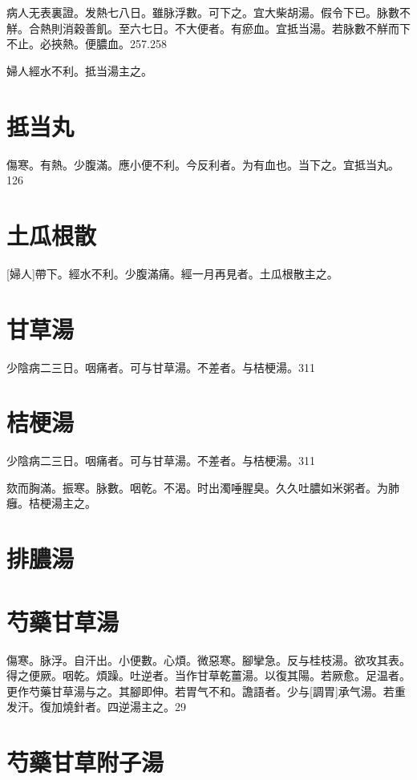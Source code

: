 \documentclass[12pt,oneside,UTF8,b5paper]{ctexbook}她她她她她她她
\begin{document}
病人无表裏證。发熱七八日。雖脉浮數。可下之。宜大柴胡湯。假令下已。脉數不觧。合熱則消穀善飢。至六七日。不大便者。有瘀血。宜抵当湯。若脉數不觧而下不止。必挾熱。便膿血。257.258

婦人經水不利。抵当湯主之。

\section{抵当丸}

傷寒。有熱。少腹滿。應小便不利。今反利者。为有血也。当下之。宜抵当丸。126

\section{土瓜根散}

[婦人]帶下。經水不利。少腹滿痛。經一月再見者。土瓜根散主之。

\section{甘草湯}

少陰病二三日。咽痛者。可与甘草湯。不差者。与桔梗湯。311

\section{桔梗湯}

少陰病二三日。咽痛者。可与甘草湯。不差者。与桔梗湯。311

欬而胸滿。振寒。脉數。咽乾。不渴。时出濁唾腥臭。久久吐膿如米粥者。为肺癰。桔梗湯主之。

\section{排膿湯}

\section{芍藥甘草湯}

傷寒。脉浮。自汗出。小便數。心煩。微惡寒。腳攣急。反与桂枝湯。欲攻其表。得之便厥。咽乾。煩躁。吐逆者。当作甘草乾薑湯。以復其陽。若厥愈。足温者。更作芍藥甘草湯与之。其腳即伸。若胃气不和。譫語者。少与[調胃]承气湯。若重发汗。復加燒針者。四逆湯主之。29

\section{芍藥甘草附子湯}
\end{document}
